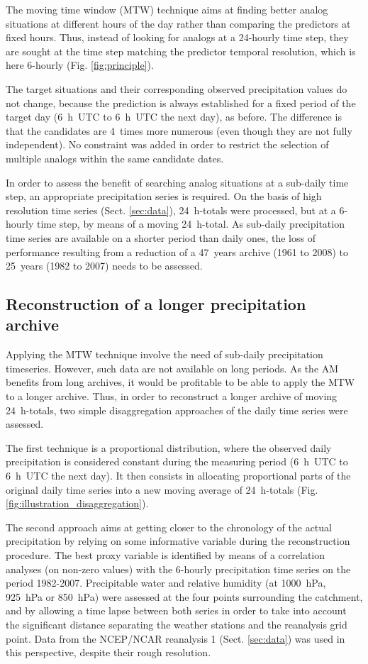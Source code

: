 \documentclass[hess, manuscript]{copernicus}
\begin{document}
The moving time window (MTW) technique aims at finding better analog situations at different hours of the day rather than comparing the predictors at fixed hours. Thus, instead of looking for analogs at a 24-hourly time step, they are sought at the time step matching the predictor temporal resolution, which is here 6-hourly (Fig. \ref{fig:principle}).

The target situations and their corresponding observed precipitation values do not change, because the prediction is always established for a fixed period of the target day (6~h~UTC to 6~h~UTC the next day), as before. The difference is that the candidates are 4~times more numerous (even though they are not fully independent). No constraint was added in order to restrict the selection of multiple analogs within the same candidate dates.

In order to assess the benefit of searching analog situations at a sub-daily time step, an appropriate precipitation series is required. On the basis of high resolution time series (Sect. \ref{sec:data}), 24~h-totals were processed, but at a 6-hourly time step, by means of a moving 24~h-total.  As sub-daily precipitation time series are available on a shorter period than daily ones, the loss of performance resulting from a reduction of a 47~years archive (1961 to 2008) to 25~years (1982 to 2007) needs to be assessed.


\subsection{Reconstruction of a longer precipitation archive}
\label{sec:reconstruction}

Applying the MTW technique involve the need of sub-daily precipitation timeseries. However, such data are not available on long periods. As the AM benefits from long archives, it would be profitable to be able to apply the MTW to a longer archive. Thus, in order to reconstruct a longer archive of moving 24~h-totals, two simple disaggregation approaches of the daily time series were assessed.

The first technique is a proportional distribution, where the observed daily precipitation is considered constant during the measuring period (6~h~UTC to 6~h~UTC the next day). It then consists in allocating proportional parts of the original daily time series into a new moving average of 24~h-totals (Fig. \ref{fig:illustration_disaggregation}). 

The second approach aims at getting closer to the chronology of the actual precipitation by relying on some informative variable during the reconstruction procedure. The best proxy variable is identified by means of a correlation analyses (on non-zero values) with the 6-hourly precipitation time series on the period 1982-2007. Precipitable water and relative humidity (at 1000~hPa, 925~hPa or 850~hPa) were assessed at the four points surrounding the catchment, and by allowing a time lapse between both series in order to take into account the significant distance separating the weather stations and the reanalysis grid point. Data from the NCEP/NCAR reanalysis 1 (Sect. \ref{sec:data}) was used in this perspective, despite their rough resolution.
\end{document}
